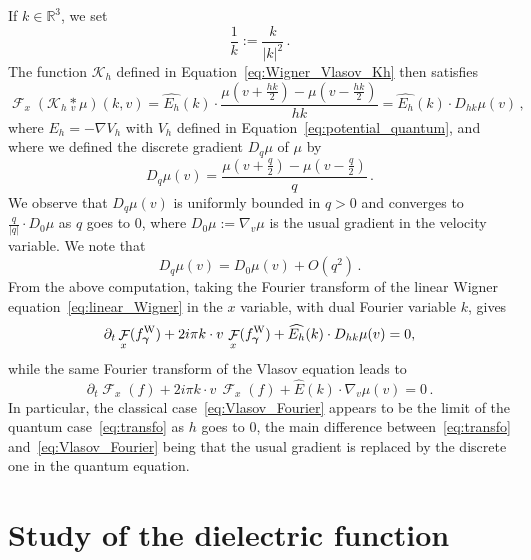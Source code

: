 \documentclass[a4paper,12pt]{amsart} %
\theoremstyle{plain}
\theoremstyle{definition}
\newcommand		{\RR}		{\mathbb R}			%
\newcommand		{\R}		{\RR}
\newcommand		{\Rd}		{\R^3}
\newcommand		{\cK}		{\mathcal K}		%
\newcommand		{\lt}			{\left}				%
\newcommand		{\rt}			{\right}			%
\renewcommand	{\(}			{\lt(}
\renewcommand	{\)}			{\rt)}
\newcommand		{\n}[1]			{\lt\lvert{#1}\rt\rvert}	%
\newcommand			{\dpt}		{\partial_t}
\newcommand			{\Dv}		{\nabla_v}
\DeclareMathOperator{\cF}		{\mathcal{F}}		%
\newcommand	{\h}			{h}
\newcommand		{\opgam}		{{\boldsymbol{\gamma}}}
\newcommand		{\op}			{\opgam}	%
\newcommand	 {\Wigner}[1]		{f^\textnormal{W}_{#1}}
\begin{document}
	If $k \in \Rd$, we set
	\begin{equation*}
		\frac{1}{k} := \frac{k}{\n{k}^2}\, .
	\end{equation*}
	The function $\cK_\h$ defined in Equation~\eqref{eq:Wigner_Vlasov_Kh} then satisfies
	\begin{equation*}
		\cF_x\lt(\cK_\h\underset{v}{*} \mu\rt)(k,v) = \widehat{E_\h}(k)\cdot \frac{\mu(v+\tfrac{h k}{2}) - \mu(v-\tfrac{h k}{2})}{hk} = \widehat{E_\h}(k)\cdot D_{h k}\mu(v) \, ,
	\end{equation*}
	where $E_\h = - \nabla V_\h$ with $V_\h$ defined in Equation~\eqref{eq:potential_quantum}, and where we defined the discrete gradient $D_q \mu$ of $\mu$ by
	\begin{equation*}
	D_q\mu(v) = \frac{\mu(v+\tfrac{q}{2}) - \mu(v-\tfrac{q}{2})}{q} \, .
	\end{equation*}
	We observe that $D_q \mu(v)$ is uniformly bounded in $q > 0$ and converges to $\frac{q}{\n{q}}\cdot D_0 \mu$ as $q$ goes to $0$, where $D_0\mu := \nabla_v \mu$ is the usual gradient in the velocity variable. We note that
	\begin{equation*}
		D_q \mu(v) = D_0 \mu(v) + O(q^2) \, .
	\end{equation*}
	From the above computation, taking the Fourier transform of the linear Wigner equation~\eqref{eq:linear_Wigner} in the $x$ variable, with dual Fourier variable $k$, gives
	\begin{equation}\label{eq:transfo}
		\dpt \cF_x(\Wigner{\op}) + 2i\pi k\cdot v \,\cF_x(\Wigner{\op}) + \widehat{E_\h}(k)\cdot D_{h k}\mu(v) = 0,
	\end{equation}
	while the same Fourier transform of the Vlasov equation leads to
	\begin{equation}\label{eq:Vlasov_Fourier}
		\dpt \cF_x(f) + 2i\pi k\cdot v \,\cF_x(f) + \widehat{E}(k)\cdot \Dv\mu(v) = 0 \, .
	\end{equation}
	In particular, the classical case~\eqref{eq:Vlasov_Fourier} appears to be the limit of the quantum case~\eqref{eq:transfo} as $\h$ goes to $0$, the main difference between~\eqref{eq:transfo} and~\eqref{eq:Vlasov_Fourier} being that the usual gradient is replaced by the discrete one in the quantum equation.


\section{Study of the dielectric function}
\end{document}
